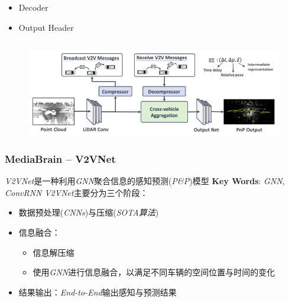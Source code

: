 \documentclass[8]{beamer}
\begin{document}
\begin{frame}
\begin{columns}
    \begin{column}{0.5\linewidth}
        \begin{itemize}
            \item Decoder
            \item Output Header
        \end{itemize}
    \end{column}
\end{columns}
\end{frame}

\begin{frame}
    \begin{figure}
        \includegraphics[width=0.7\linewidth]{pic/V2Vnet.png}
    \end{figure}
    \frametitle{MediaBrain -- V2VNet\cite{wang2020v2vnet}}
        \textit{V2VNet}是一种利用\textit{GNN}聚合信息的感知预测(\textit{P\&P})模型 
        \bigskip
        \textbf{Key Words}: \textit{GNN}, \textit{ConvRNN}
    \textit{V2VNet}主要分为三个阶段：
    \begin{itemize}
        \footnotesize
        \item 数据预处理(\textit{CNNs})与压缩(\textit{SOTA算法})
        \item 信息融合：
            \begin{itemize}
                \item 信息解压缩
                \item 使用\textit{GNN}进行信息融合，以满足不同车辆的空间位置与时间的变化
            \end{itemize}
        \item 结果输出：\textit{End-to-End}输出感知与预测结果
    \end{itemize}
\end{frame}
\end{document}
